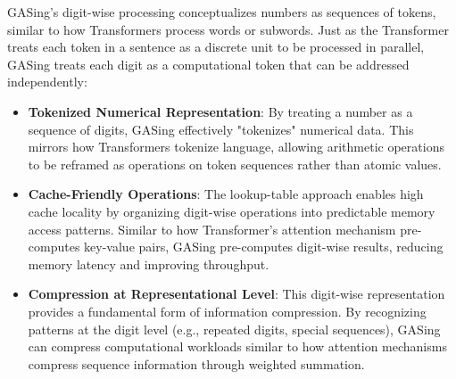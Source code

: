 GASing's digit-wise processing conceptualizes numbers as sequences of tokens, similar to how Transformers process words or subwords. Just as the Transformer treats each token in a sentence as a discrete unit to be processed in parallel, GASing treats each digit as a computational token that can be addressed independently:
\begin{itemize}
\item \textbf{Tokenized Numerical Representation}: By treating a number as a sequence of digits, GASing effectively "tokenizes" numerical data. This mirrors how Transformers tokenize language, allowing arithmetic operations to be reframed as operations on token sequences rather than atomic values.
\item \textbf{Cache-Friendly Operations}: The lookup-table approach enables high cache locality by organizing digit-wise operations into predictable memory access patterns. Similar to how Transformer's attention mechanism pre-computes key-value pairs, GASing pre-computes digit-wise results, reducing memory latency and improving throughput.
\item \textbf{Compression at Representational Level}: This digit-wise representation provides a fundamental form of information compression. By recognizing patterns at the digit level (e.g., repeated digits, special sequences), GASing can compress computational workloads similar to how attention mechanisms compress sequence information through weighted summation.

\end{itemize}
